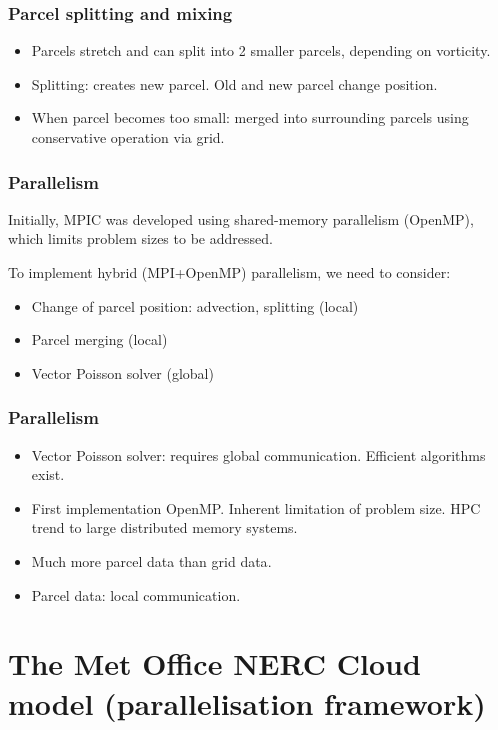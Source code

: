 \documentclass{beamer}
\def\oran#1{\color{orange} #1}
\def\gr#1{\color{dark_green} #1}
\def\re#1{\color{red}   #1}
\def\bl#1{\color{blue}  #1}
\def\pu#1{\color{purple} #1}
\begin{document}
\begin{frame}
\frametitle{Parcel splitting and mixing}

\begin{itemize}
\item Parcels stretch and can split into 2 smaller parcels, depending on vorticity.
\item Splitting: creates new parcel. Old and new parcel change position.
\item When parcel becomes too small: merged into surrounding parcels using conservative operation via grid.
\end{itemize}

\end{frame}

\begin{frame}
\frametitle{Parallelism}

Initially, MPIC was developed using shared-memory parallelism (OpenMP), which limits problem sizes to be addressed.

To implement hybrid (MPI+OpenMP) parallelism, we need to consider:

\begin{itemize}
\item Change of parcel position: advection, splitting (local)
\item Parcel merging (local)
\item Vector Poisson solver (global)
\end{itemize}

\end{frame}


\begin{frame}
\frametitle{Parallelism}

\vspace{0.2cm}
\begin{itemize}
\item Vector Poisson solver: requires global communication. {\bl Efficient algorithms} exist.
\item First implementation OpenMP. Inherent limitation of problem size. HPC trend to {\pu large distributed memory systems}. 
\item Much more {\re parcel data} than {\gr grid data}.
\item Parcel data: {\oran local communication}.
\end{itemize}

\centering

\end{frame}

\section{The Met Office NERC Cloud model (parallelisation framework)}
\end{document}
